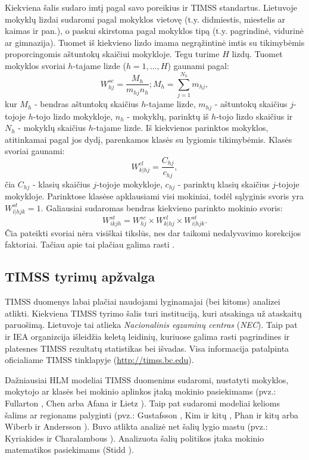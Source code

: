 \documentclass[12pt,a4paper]{article}
\begin{document}
\indent Kiekviena šalis sudaro imtį pagal savo poreikius ir TIMSS standartus. Lietuvoje mokyklų lizdai sudaromi pagal mokyklos vietovę (t.y. didmiestis, miestelis ar kaimas ir pan.), o paskui skirstoma pagal mokyklos tipą (t.y. pagrindinė, vidurinė ar gimnazija). Tuomet iš kiekvieno lizdo imama negrąžintinė imtis su tikimybėmis proporcingomis aštuntokų skaičiui mokykloje. Tegu turime $H$ lizdų. Tuomet mokyklos svoriai $h$-tajame lizde ($h=1,\dots,H$) gaunami pagal:
\begin{equation}
W^{sc}_{hj} = \frac{M_h}{m_{hj}n_h}; M_h=\sum^{N_h}_{j=1} m_{hj},
\end{equation}
kur $M_h$ - bendras aštuntokų skaičius $h$-tajame lizde, $m_{hj}$ - aštuntokų skaičius $j$-tojoje $h$-tojo lizdo mokykloje, $n_h$ - mokyklų, parinktų iš $h$-tojo lizdo skaičius ir $N_h$ - mokyklų skaičius $h$-tajame lizde. Iš kiekvienos parinktos mokyklos, atitinkamai pagal jos dydį, parenkamos klasės su lygiomis tikimybėmis. Klasės svoriai gaunami:
\begin{equation}
W^{cl}_{k|hj} = \frac{C_{hj}}{c_{hj}},
\end{equation}
čia $C_{hj}$ - klasių skaičius $j$-tojoje mokykloje, $c_{hj}$ - parinktų klasių skaičius $j$-tojoje mokykloje. Parinktose klasėse apklausiami visi mokiniai, todėl sąlyginis svoris yra $W^{st}_{i|hjk} = 1$. Galiausiai sudaromas bendras kiekvieno parinkto mokinio svoris:
\begin{equation}
W^{st}_{ikjh} = W^{sc}_{hj}\times W^{cl}_{k|hj}\times W^{st}_{i|hjk}.
\end{equation}
Čia pateikti svoriai nėra visiškai tikslūs, nes dar taikomi nedalyvavimo korekcijos faktoriai. Tačiau apie tai plačiau galima rasti \cite{2011Sample}.

\subsection{TIMSS tyrimų apžvalga}
TIMSS duomenys labai plačiai naudojami lyginamajai (bei kitoms) analizei atlikti. Kiekviena TIMSS tyrimo šalis turi instituciją, kuri atsakinga už ataskaitų paruošimą. Lietuvoje tai atlieka \textit{Nacionalinis egzaminų centras} (\textit{NEC}). Taip pat ir IEA organizcija išleidžia keletą leidinių, kuriuose galima rasti pagrindines ir platesnes TIMSS rezultatų statistikas bei išvadas. Visa informacija patalpinta oficialiame TIMSS tinklapyje (\url{http://timss.bc.edu}).

\indent Dažniausiai HLM modeliai TIMSS duomenims sudaromi, nustatyti mokyklos, mokytojo ar klasės bei mokinio aplinkos įtaką mokinio pasiekimams (pvz.: Fullarton \cite{timssSch1}, Chen \cite{timssSchool2} arba Afana ir Lietz \cite{timssCpalyg1}). Taip pat sudaromi modeliai kelioms šalims ar regionams palyginti (pvz.: Gustafsson \cite{timssCpalyg}, Kim ir kitų \cite{timssCpalyg2}, Phan ir kitų \cite{timssCpalyg3} arba Wiberb ir Andersson \cite{timssCpalyg4}). Buvo atlikta analizė net šalių lygio mastu (pvz.: Kyriakides ir Charalambous \cite{countryHLM}). Analizuota šalių politikos įtaka mokinio matematikos pasiekimams (Stidd \cite{timssPol}).
\end{document}
